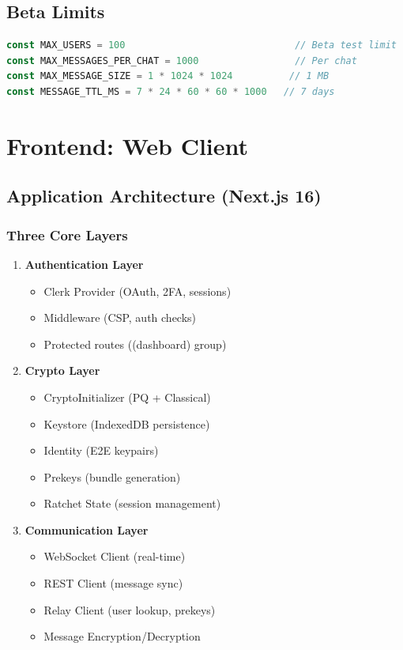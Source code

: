 \documentclass[11pt,a4paper,oneside]{book}
\begin{document}
\vspace{-0.3cm}\section{Beta Limits}
\begin{lstlisting}[language=TypeScript]
const MAX_USERS = 100                              // Beta test limit
const MAX_MESSAGES_PER_CHAT = 1000                 // Per chat
const MAX_MESSAGE_SIZE = 1 * 1024 * 1024          // 1 MB
const MESSAGE_TTL_MS = 7 * 24 * 60 * 60 * 1000   // 7 days
\end{lstlisting}
\vspace{-0.5cm}\chapter{Frontend: Web Client}
\vspace{-0.3cm}\section{Application Architecture (Next.js 16)}
\vspace{-0.2cm}\subsection{Three Core Layers}
\begin{enumerate}
  \item \textbf{Authentication Layer}
  \begin{itemize}
    \item Clerk Provider (OAuth, 2FA, sessions)
    \item Middleware (CSP, auth checks)
    \item Protected routes ((dashboard) group)
  \end{itemize}
  \item \textbf{Crypto Layer}
  \begin{itemize}
    \item CryptoInitializer (PQ + Classical)
    \item Keystore (IndexedDB persistence)
    \item Identity (E2E keypairs)
    \item Prekeys (bundle generation)
    \item Ratchet State (session management)
  \end{itemize}
  \item \textbf{Communication Layer}
  \begin{itemize}
    \item WebSocket Client (real-time)
    \item REST Client (message sync)
    \item Relay Client (user lookup, prekeys)
    \item Message Encryption/Decryption
  \end{itemize}
\end{enumerate}
\end{document}
